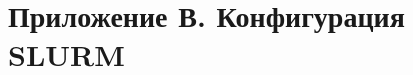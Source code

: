 \section*{Приложение В. Конфигурация SLURM}
\label{app:slurm-conf}

\renewcommand{\theFancyVerbLine}{%
    \scriptsize\ttfamily\textcolor{gray}{\arabic{FancyVerbLine}}%
}

\inputminted[linenos, numbersep=10pt, firstnumber=1, fontsize=\scriptsize, breaklines]{text}{code/slurm.conf}
